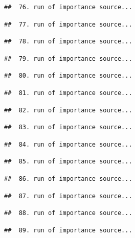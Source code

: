 \documentclass[
]{article}
\begin{document}
\begin{verbatim}
##  76. run of importance source...
\end{verbatim}

\begin{verbatim}
##  77. run of importance source...
\end{verbatim}

\begin{verbatim}
##  78. run of importance source...
\end{verbatim}

\begin{verbatim}
##  79. run of importance source...
\end{verbatim}

\begin{verbatim}
##  80. run of importance source...
\end{verbatim}

\begin{verbatim}
##  81. run of importance source...
\end{verbatim}

\begin{verbatim}
##  82. run of importance source...
\end{verbatim}

\begin{verbatim}
##  83. run of importance source...
\end{verbatim}

\begin{verbatim}
##  84. run of importance source...
\end{verbatim}

\begin{verbatim}
##  85. run of importance source...
\end{verbatim}

\begin{verbatim}
##  86. run of importance source...
\end{verbatim}

\begin{verbatim}
##  87. run of importance source...
\end{verbatim}

\begin{verbatim}
##  88. run of importance source...
\end{verbatim}

\begin{verbatim}
##  89. run of importance source...
\end{verbatim}
\end{document}
